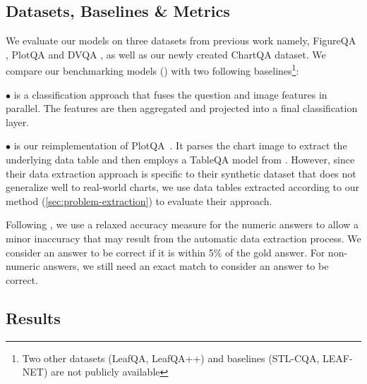 
\subsection{Datasets, Baselines \& Metrics} 

We evaluate our models on three datasets from previous work namely, FigureQA \cite{figureqa}, PlotQA \cite{plotqa} and DVQA \cite{dvqa}, as well as our newly created ChartQA dataset. We compare our benchmarking models () with two following baselines\footnote{Two other datasets (LeafQA, LeafQA++) and baselines  (STL-CQA, LEAF-NET) are not publicly available}:






\vspace{0.2em}
\noindent \textbf{$\bullet$ {}} \cite{prefil} is a classification approach that fuses the question and image features in parallel. The features are then aggregated and projected into a final classification layer.




 \vspace{0.2em}
\noindent \textbf{$\bullet$ {}} is our reimplementation of PlotQA~\cite{plotqa}. It 
parses the chart image to extract the underlying data table and then employs a TableQA model  
from \citet{sempre}. However, since their data extraction approach is specific to their synthetic dataset that does not generalize well to real-world charts, 
we use data tables extracted according to our method  (\cref{sec:problem-extraction}) to evaluate their approach. 

Following \citet{plotqa}, we use a relaxed accuracy measure for the numeric answers to allow a minor inaccuracy that may result from the automatic data extraction process.
We consider an answer to be correct if it is within 5\% of the gold answer. For non-numeric answers, we still need an exact match to consider an answer to be correct.






\subsection{Results}

